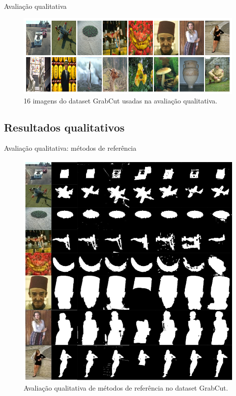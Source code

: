 \documentclass{templatebeamerufc/libs/ufc_format}
\begin{document}
\begin{frame}{Avaliação qualitativa}
  \begin{figure}\label{fig:imagens-avaliadas}
    \centering
    \caption{16 imagens do dataset GrabCut usadas na avaliação qualitativa.}
    \includegraphics[scale=0.55]{figuras/imagens-avaliadas}
  \end{figure}
\end{frame}


\subsection{Resultados qualitativos}
\begin{frame}{Avaliação qualitativa: métodos de referência}
    \begin{figure}\label{fig:grabcut-comparacao-split1}
    \centering
    \caption{Avaliação qualitativa de métodos de referência no dataset GrabCut.}
    \includegraphics[scale=0.325]{figuras/grabcut-comparacao-split1}
  \end{figure}
\end{frame}
\end{document}
